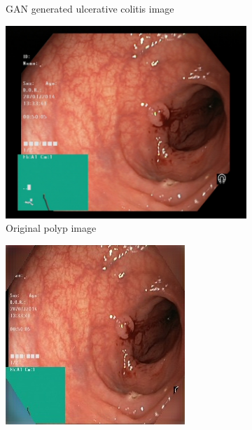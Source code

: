 \begin{figure}[h]
\begin{subfigure}[t]{\myfigsizethree}
            \caption{ GAN generated ulcerative colitis image}   
            \label{fig:polyp_GAN_CORNER2}
        \end{subfigure}
        \qquad\vfill%
        \begin{subfigure}[t]{\myfigsizethree}   
            \centering 
            \includegraphics[height=\textwidth, width=\textwidth]{experiments/figures/blackcorner/polypwithgreenORIG.jpg}
            \caption{ Original polyp image }   
            \label{fig:z_ORIG_CORNER2}
        \end{subfigure}
        \qquad
        \begin{subfigure}[t]{\myfigsizethree}   
            \centering 
            \includegraphics[width=\textwidth]{experiments/figures/blackcorner/polypwithgreenAE.jpg}

\end{subfigure}
\end{figure}
